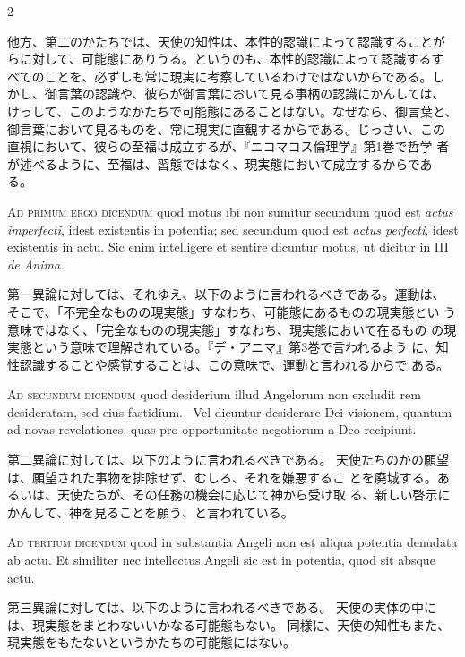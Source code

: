 \documentclass[paper=a4paper,fontsize=10pt,jafontsize=9pt,titlepage]{jlreq}
\begin{document}
\begin{paracol}{2}
\switchcolumn

他方、第二のかたちでは、天使の知性は、本性的認識によって認識することが
らに対して、可能態にありうる。というのも、本性的認識によって認識するす
べてのことを、必ずしも常に現実に考察しているわけではないからである。し
かし、御言葉の認識や、彼らが御言葉において見る事柄の認識にかんしては、
けっして、このようなかたちで可能態にあることはない。なぜなら、御言葉と、
御言葉において見るものを、常に現実に直観するからである。じっさい、この
直視において、彼らの至福は成立するが、『ニコマコス倫理学』第1巻で哲学
者が述べるように、至福は、習態ではなく、現実態において成立するからであ
る。

\switchcolumn*

{\scshape Ad primum ergo dicendum} quod motus ibi non
sumitur secundum quod est {\itshape actus imperfecti}, idest existentis in
potentia; sed secundum quod est {\itshape actus perfecti}, idest existentis in
actu. Sic enim intelligere et sentire dicuntur motus, ut dicitur in III
{\itshape de Anima}.

\switchcolumn

第一異論に対しては、それゆえ、以下のように言われるべきである。運動は、
そこで、「不完全なものの現実態」すなわち、可能態にあるものの現実態とい
う意味ではなく、「完全なものの現実態」すなわち、現実態において在るもの
の現実態という意味で理解されている。『デ・アニマ』第3巻で言われるよう
に、知性認識することや感覚することは、この意味で、運動と言われるからで
ある。

\switchcolumn*

{\scshape Ad secundum dicendum} quod desiderium illud
Angelorum non excludit rem desideratam, sed eius fastidium. --Vel dicuntur
desiderare Dei visionem, quantum ad novas revelationes, quas pro
opportunitate negotiorum a Deo recipiunt.

\switchcolumn

第二異論に対しては、以下のように言われるべきである。
天使たちのかの願望は、願望された事物を排除せず、むしろ、それを嫌悪するこ
とを廃城する。あるいは、天使たちが、その任務の機会に応じて神から受け取
る、新しい啓示にかんして、神を見ることを願う、と言われている。

\switchcolumn*

{\scshape Ad tertium dicendum} quod in substantia Angeli
non est aliqua potentia denudata ab actu. Et similiter nec intellectus
Angeli sic est in potentia, quod sit absque actu.

\switchcolumn

第三異論に対しては、以下のように言われるべきである。
天使の実体の中には、現実態をまとわないいかなる可能態もない。
同様に、天使の知性もまた、現実態をもたないというかたちの可能態にはない。

\switchcolumn*

\end{paracol}
\end{document}
